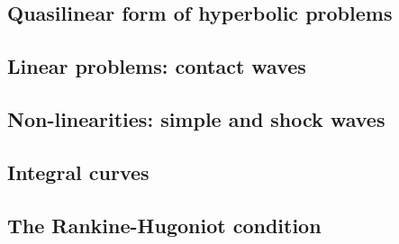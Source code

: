 
\subsection{Quasilinear form of hyperbolic problems}
\subsection{Linear problems: contact waves}
\subsection{Non-linearities: simple and shock waves}
\subsection{Integral curves}
\subsection{The Rankine-Hugoniot condition}


